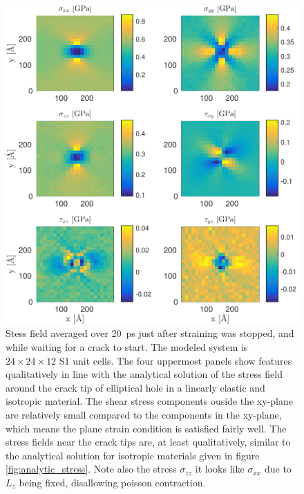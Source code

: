\begin{figure}
\centering
\includegraphics[width=\textwidth]{../figures/thesis/stressfield_avg_wait_for_crack.pdf}
\caption{Stess field averaged over \SI{20}{\pico\second} just after straining was stopped, and while waiting for a crack to start. The modeled system is $24\times 24\times 12$ S1 unit cells. The four uppermost panels show features qualitatively in line with the analytical solution of the stress field around the crack tip of elliptical hole in a linearly elastic and isotropic material. The shear stress components ouside the xy-plane are relatively small compared to the components in the xy-plane, which means the plane strain condition is satisfied fairly well. The stress fields near the crack tips are, at least qualitatively, similar to the analytical solution for isotropic materials given in figure \ref{fig:analytic_stress}. Note also the stress $\sigma_{zz}$ it looks like $\sigma_{xx}$ due to $L_z$ being fixed, disallowing poisson contraction.}
\label{fig:stressfield_avg_wait_for_crack}
\end{figure}



